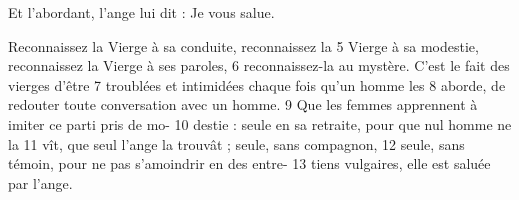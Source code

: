 Et l'abordant, l'ange lui dit : Je vous salue.

Reconnaissez la Vierge à sa conduite, reconnaissez la	 
5	 	Vierge à sa modestie, reconnaissez la Vierge à ses paroles,	 
6	 	reconnaissez-la au mystère. C'est le fait des vierges d'être	 
7	 	troublées et intimidées chaque fois qu'un homme les	 
8	 	aborde, de redouter toute conversation avec un homme.	 
9	 	Que les femmes apprennent à imiter ce parti pris de mo-	 
10	 	destie : seule en sa retraite, pour que nul homme ne la	 
11	 	vît, que seul l'ange la trouvât ; seule, sans compagnon,	 
12	 	seule, sans témoin, pour ne pas s'amoindrir en des entre-	 
13	 	tiens vulgaires, elle est saluée par l'ange.